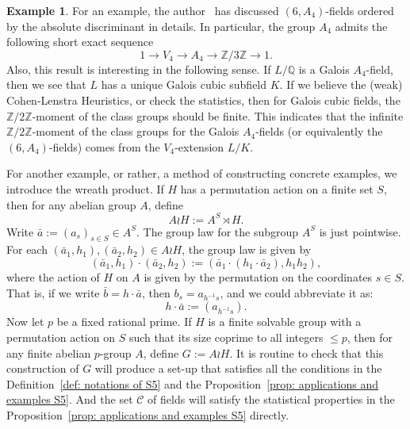 \documentclass[12pt,a4paper]{amsart}
\numberwithin{equation}{section}%
\theoremstyle{plain}%
\theoremstyle{definition}%
\newtheorem{example}[theorem]{Example}%
\theoremstyle{remark}%
\begin{document}
    \begin{example}%
    	For an example, the author~\cite{wang2026invariant} has discussed $(6,A_{4})$-fields ordered by the absolute discriminant in details.
    	In particular, the group $A_{4}$ admits the following short exact sequence
    	\begin{equation*}
    		1\to V_{4}\to A_{4}\to \mathbb{Z}/3\mathbb{Z}\to1.%
    	\end{equation*}  
    	Also, this result is interesting in the following sense.
    	If $L/\mathbb{Q}$ is a Galois $A_{4}$-field, then we see that $L$ has a unique Galois cubic subfield $K$.
    	If we believe the (weak) Cohen-Lenstra Heuristics, or check the statistics, then for Galois cubic fields, the $\mathbb{Z}/2\mathbb{Z}$-moment of the class groups should be finite.
    	This indicates that the infinite $\mathbb{Z}/2\mathbb{Z}$-moment of the class groups for the Galois $A_{4}$-fields (or equivalently the $(6,A_{4})$-fields) comes from the $V_{4}$-extension $L/K$.
    	
    	For another example, or rather, a method of constructing concrete examples, we introduce the wreath product.
    	If $H$ has a permutation action on a finite set $S$, then for any abelian group $A$, define
    	\begin{equation*}
    		A\wr H:=A^{S}\rtimes H.%
    	\end{equation*}
    	Write $\bar{a}:=(a_{s})_{s\in S}\in A^{S}$.
    	The group law for the subgroup $A^{S}$ is just pointwise.
    	For each $(\bar{a}_{1},h_{1}),(\bar{a}_{2},h_{2})\in A\wr H$, the group law is given by
    	\begin{equation*}%
    		(\bar{a}_{1},h_{1})\cdot(\bar{a}_{2},h_{2}):=(\bar{a}_{1}\cdot(h_{1}\cdot\bar{a}_{2}),h_{1}h_{2}),%
    	\end{equation*}%
    	where the action of $H$ on $A$ is given by the permutation on the coordinates $s\in S$.
    	That is, if we write $\bar{b}=h\cdot\bar{a}$, then $b_{s}=a_{h^{-1}s}$, and we could abbreviate it as:
    	\begin{equation*}%
    		h\cdot\bar{a}:=(a_{h^{-1}s}).%
    	\end{equation*}%
    	Now let $p$ be a fixed rational prime.
    	If $H$ is a finite solvable group with a permutation action on $S$ such that its size coprime to all integers $\leq p$, then for any finite abelian $p$-group $A$, define $G:=A\wr H$.
    	It is routine to check that this construction of $G$ will produce a set-up that satisfies all the conditions in the Definition~\ref{def: notations of S5} and the Proposition~\ref{prop: applications and examples S5}.
    	And the set $\mathcal{C}$ of fields will satisfy the statistical properties in the Proposition~\ref{prop: applications and examples S5} directly.
    	

\end{example}
\end{document}
